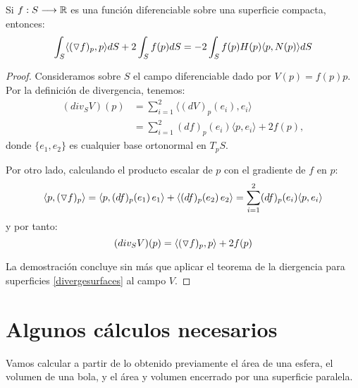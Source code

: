 \begin{corolario}\label{corolariogradiente}
Si $f: S \longrightarrow \mathbb{R}$ es una función diferenciable sobre una superficie compacta, entonces:
%
\begin{equation*}
    \int_S \langle (\triangledown f)_p, p \rangle dS + 2 \int_S f(p)dS = -2 \int_S f(p)H(p) \langle p, N(p) \rangle dS
\end{equation*}
\end{corolario}
\begin{proof}
Consideramos sobre $S$ el campo diferenciable dado por $V(p)=f(p)p$. Por la definición de divergencia, tenemos:
%
\begin{align*}
    (div_S V)(p) &= \sum_{i=1}^2 \langle (dV)_p(e_i), e_i \rangle \\
    &= \sum_{i=1}^2 (df)_p(e_i) \langle p, e_i \rangle + 2f(p),
\end{align*}
%
donde $\{e_1,e_2\}$ es cualquier base ortonormal en $T_pS$.

Por otro lado, calculando el producto escalar de $p$ con el gradiente de $f$ en $p$:
%
\begin{equation*}
    \langle p, (\triangledown f)_p \rangle = \langle p, (df)_p(e_1) \, e_1 \rangle + \langle (df)_p(e_2) \, e_2 \rangle = \sum_{i=1}^2 (df)_p(e_i) \langle p, e_i \rangle 
\end{equation*}
%
y por tanto:
%
\begin{equation*}
    (div_S V)(p) = \langle (\triangledown f)_p, p \rangle + 2f(p)
\end{equation*}

La demostración concluye sin más que aplicar el teorema de la diergencia para superficies \ref{divergesurfaces} al campo $V$.
\end{proof}

\section{Algunos cálculos necesarios}

Vamos calcular a partir de lo obtenido previamente el área de una esfera, el volumen de una bola, y el área y volumen encerrado por una superficie paralela.

